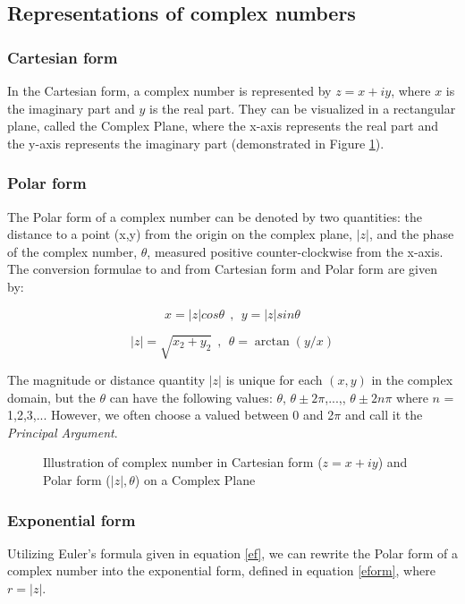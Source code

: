 \subsection{Representations of complex numbers}

\subsubsection{Cartesian form}
In the Cartesian form, a complex number is represented by $z=x+iy$, where $x$ is the imaginary part and $y$ is the real part. They can be visualized in a rectangular plane, called the Complex Plane, where the x-axis represents the real part and the y-axis represents the imaginary part (demonstrated in Figure \ref{fig:complexrep}). 

\subsubsection{Polar form}
The Polar form of a complex number can be denoted by two quantities: 
the distance to a point (x,y) from the origin on the complex plane, $|z|$, and the phase of the complex number, $\theta$, measured positive counter-clockwise from the x-axis. The conversion formulae to and from Cartesian form and Polar form are given by:





\begin{equation}
x = |z|cos\theta  ~~,~~ y = |z|sin\theta 
\end{equation}

\begin{equation}
|z| = \sqrt{x_{2}+y_{2}}  ~~,~~ \theta = \arctan(y/x) 
\end{equation}

The magnitude or distance quantity $|z|$ is unique for each $(x,y)$ in the complex domain, but the $\theta$ can have the following values: $\theta$, $\theta \pm \mathrm{2}\pi$,...,, $\theta \pm \mathrm{2}n\pi$ where $n$ = 1,2,3,... However, we often choose a valued between $0$ and 2$\pi$ and call it the \textit{Principal Argument}.

\begin{figure}[htb]
	\centering
	\epsfxsize=5cm
	{}
	\caption{Illustration of complex number in Cartesian form ($z=x+iy$) and Polar form ($|z|,\theta$) on a Complex Plane}
	\label{fig:complexrep}
\end{figure}

\subsubsection{Exponential form}
Utilizing Euler's formula given in equation \ref{ef}, we can rewrite the Polar form of a complex number into the exponential form, defined in equation \ref{eform}, where $r = |z|$.


